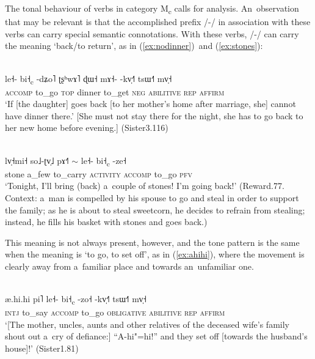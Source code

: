 The tonal behaviour of verbs in category M\textsubscript{c} calls for analysis. An~observation that may be relevant is that the {accomplished} prefix
/-/ in association with these verbs can carry special semantic connotations. With these verbs,
/-/ can carry the meaning ‘back/to return’, as in (\ref{ex:nodinner})~and (\ref{ex:stones}):
\begin{exe}
  \ex
  \label{ex:nodinner}
  \\
  \gll le˧-	bi˧\textsubscript{c}	-dʑo˥	ʈʂʰwɤ˥	ɖɯ˧	mɤ˧-	-kv̩˧˥	tsɯ˧˥	mv̩˧\\
  \textsc{accomp}	to\_go	\textsc{top}	dinner	to\_get	\textsc{neg}	\textsc{abilitive}
  \textsc{rep}	\textsc{affirm}\\
  \glt ‘If [the daughter] goes back [to her mother’s home after marriage, she] cannot have dinner
  there.’ [She must not stay there for the night, she has to go back to her new home before
    evening.] (Sister3.116)

  \ex
  \label{ex:stones}
  \\
  \gll lv̩˧mi˧	so˩-ʈv̩˩	pɤ˧˥	{$\sim$}	le˧-	bi˧\textsubscript{c}	-ze˧\\
  stone	a\_few	to\_carry	\textsc{activity}	\textsc{accomp}	to\_go	\textsc{pfv}\\
  \glt  ‘Tonight, I’ll bring (back) a~couple of stones! I’m going back!’ (Reward.77. Context: a~man
  is compelled by his spouse to go and steal in order to support the family; as he is about to steal
  sweetcorn, he decides to refrain from stealing; instead, he fills his basket with stones and goes back.)
\end{exe}

This meaning is not always present, however, and the tone pattern is the same when the meaning is
‘to go, to set off’, as in
(\ref{ex:ahihi}), where the movement is clearly away from a~familiar place and towards an~unfamiliar one.

\largerpage
\begin{exe}
  \ex
  \label{ex:ahihi}
  \\
  \gll æ.hi.hi		pi˥	le˧-	bi˧\textsubscript{c}	-zo˧	-kv̩˧˥	tsɯ˧˥	mv̩˧\\
  \textsc{intj}	to\_say	\textsc{accomp}	to\_go	\textsc{obligative}	\textsc{abilitive}
  \textsc{rep}	\textsc{affirm}\\
  \glt ‘[The mother, uncles, aunts and other relatives of the deceased wife’s family shout out a~cry
    of defiance:] “A-hi"=hi!” and they set off [towards the husband’s house]!’ (Sister1.81)
\end{exe}

